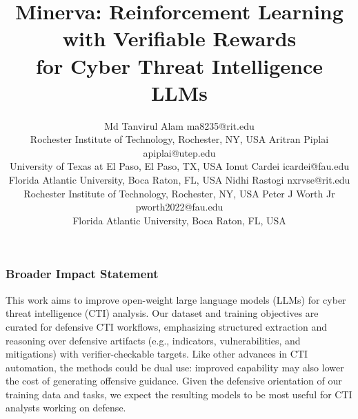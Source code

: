 \documentclass[10pt]{article}
\title{Minerva: Reinforcement Learning with Verifiable Rewards \\for Cyber Threat Intelligence LLMs}
\author{%
\name Md Tanvirul Alam \email ma8235@rit.edu \\
\addr Rochester Institute of Technology, Rochester, NY, USA
\TMLRauthorAND%
\name Aritran Piplai \email apiplai@utep.edu \\
\addr University of Texas at El Paso, El Paso, TX, USA
\TMLRauthorAND%
\name Ionut Cardei \email icardei@fau.edu \\
\addr Florida Atlantic University, Boca Raton, FL, USA
\TMLRauthorAND%
\name Nidhi Rastogi \email nxrvse@rit.edu \\
\addr Rochester Institute of Technology, Rochester, NY, USA
\TMLRauthorAND%
\name Peter J Worth Jr \email pworth2022@fau.edu \\
\addr Florida Atlantic University, Boca Raton, FL, USA
}
\theoremstyle{plain}
\theoremstyle{definition}
\theoremstyle{remark}
\begin{document}
\maketitle













\subsubsection*{Broader Impact Statement}

This work aims to improve open-weight large language models (LLMs) for cyber threat intelligence (CTI) analysis.
Our dataset and training objectives are curated for defensive CTI workflows, emphasizing structured extraction and reasoning over defensive artifacts (e.g., indicators, vulnerabilities, and mitigations) with verifier-checkable targets.
Like other advances in CTI automation, the methods could be dual use: improved capability may also lower the cost of generating offensive guidance.
Given the defensive orientation of our training data and tasks, we expect the resulting models to be most useful for CTI analysts working on defense.




\clearpage

\appendix









\end{document}

